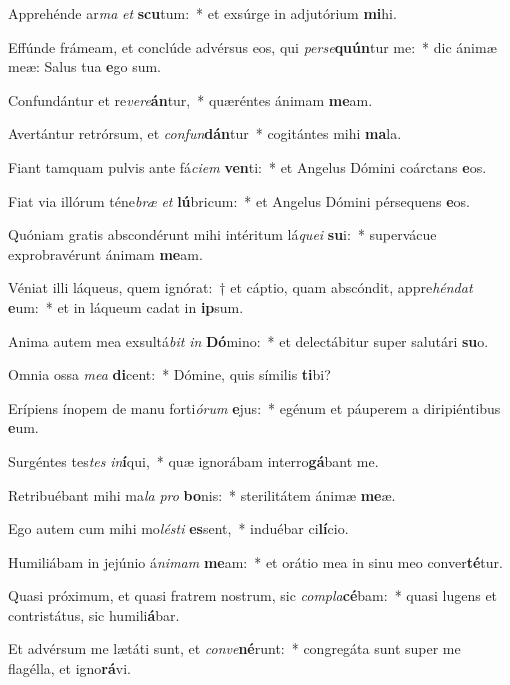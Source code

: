 \item Apprehénde ar\textit{ma} \textit{et} \textbf{scu}tum:~* et exsúrge in adjutórium \textbf{mi}hi.
\item Effúnde frámeam, et conclúde advérsus eos, qui \textit{per}\textit{se}\textbf{quún}tur me:~* dic ánimæ meæ: Salus tua \textbf{e}go sum.
\item Confundántur et re\textit{ve}\textit{re}\textbf{án}tur,~* quæréntes ánimam \textbf{me}am.
\item Avertántur retrórsum, et \textit{con}\textit{fun}\textbf{dán}tur~* cogitántes mihi \textbf{ma}la.
\item Fiant tamquam pulvis ante fá\textit{ci}\textit{em} \textbf{ven}ti:~* et Angelus Dómini coárctans \textbf{e}os.
\item Fiat via illórum téne\textit{bræ} \textit{et} \textbf{lú}bricum:~* et Angelus Dómini pérsequens \textbf{e}os.
\item Quóniam gratis abscondérunt mihi intéritum lá\textit{que}\textit{i} \textbf{su}i:~* supervácue exprobravérunt ánimam \textbf{me}am.
\item Véniat illi láqueus, quem ignórat:~† et cáptio, quam abscóndit, appre\textit{hén}\textit{dat} \textbf{e}um:~* et in láqueum cadat in \textbf{ip}sum.
\item Anima autem mea exsultá\textit{bit} \textit{in} \textbf{Dó}mino:~* et delectábitur super salutári \textbf{su}o.
\item Omnia ossa \textit{me}\textit{a} \textbf{di}cent:~* Dómine, quis símilis \textbf{ti}bi?
\item Erípiens ínopem de manu forti\textit{ó}\textit{rum} \textbf{e}jus:~* egénum et páuperem a diripiéntibus \textbf{e}um.
\item Surgéntes tes\textit{tes} \textit{in}\textbf{í}qui,~* quæ ignorábam interro\textbf{gá}bant me.
\item Retribuébant mihi ma\textit{la} \textit{pro} \textbf{bo}nis:~* sterilitátem ánimæ \textbf{me}æ.
\item Ego autem cum mihi mo\textit{lés}\textit{ti} \textbf{es}sent,~* induébar ci\textbf{lí}cio.
\item Humiliábam in jejúnio á\textit{ni}\textit{mam} \textbf{me}am:~* et orátio mea in sinu meo conver\textbf{té}tur.
\item Quasi próximum, et quasi fratrem nostrum, sic \textit{com}\textit{pla}\textbf{cé}bam:~* quasi lugens et contristátus, sic humili\textbf{á}bar.
\item Et advérsum me lætáti sunt, et \textit{con}\textit{ve}\textbf{né}runt:~* congregáta sunt super me flagélla, et igno\textbf{rá}vi.
